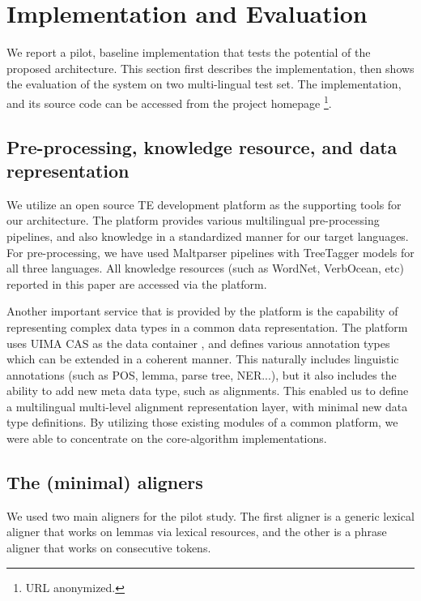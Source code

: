 \documentclass[11pt,letterpaper]{article}
\begin{document}
\section{Implementation and Evaluation}
\label{sec:impl}
We report a pilot, baseline implementation that tests the potential of 
the proposed architecture. This section first describes the
implementation, then shows the evaluation of the system on two
multi-lingual test set. The implementation, and its source code can 
be accessed from the project homepage \footnote{{URL} anonymized.}.    

\subsection{Pre-processing, knowledge resource, and data
  representation}  
We utilize an open source TE development platform \cite{} as the 
supporting tools for our architecture. The platform provides various   
multilingual pre-processing pipelines, and also knowledge in a
standardized manner for our target languages.
For pre-processing, we have used Maltparser pipelines with TreeTagger
models for all three languages. All knowledge resources (such as
WordNet, VerbOcean, etc) reported in this paper are accessed via the 
platform.    

Another important service that is provided by the platform is the
capability of representing complex data types in a common data
representation. The platform uses UIMA CAS \cite{} as the data
container \cite{}, and defines various annotation types which can be
extended in a coherent manner. This naturally includes linguistic
annotations (such as POS, lemma, parse tree, NER...), but it also
includes the ability to add new meta data type, such as
alignments. This enabled us to define a multilingual multi-level
alignment representation layer, with minimal new data type
definitions. By utilizing those existing modules of a common platform,
we were able to concentrate on the core-algorithm implementations.  

\subsection{The (minimal) aligners}
We used two main aligners for the pilot study. The first aligner is
a generic lexical aligner that works on lemmas via lexical resources,
and the other is a phrase aligner that works on consecutive tokens.  
\end{document}
